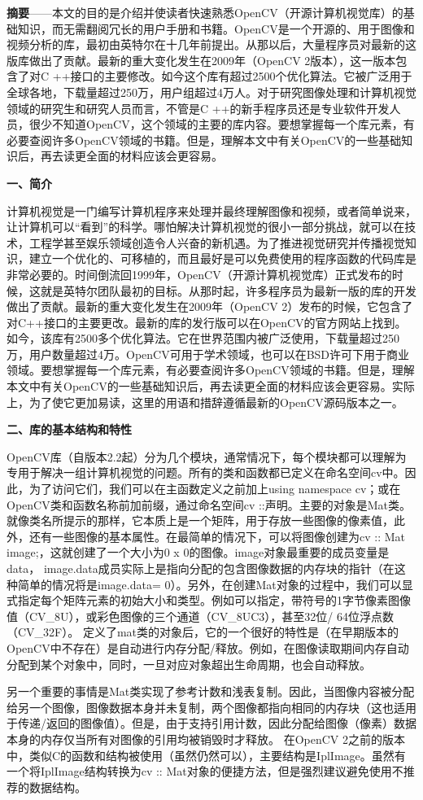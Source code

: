 \documentclass{bjtu-bachelor-thesis}
\begin{document}
\textbf{摘要}——本文的目的是介绍并使读者快速熟悉OpenCV（开源计算机视觉库）的基础知识，而无需翻阅冗长的用户手册和书籍。OpenCV是一个开源的、用于图像和视频分析的库，最初由英特尔在十几年前提出。从那以后，大量程序员对最新的这版库做出了贡献。最新的重大变化发生在2009年（OpenCV 2版本），这一版本包含了对C ++接口的主要修改。如今这个库有超过2500个优化算法。它被广泛用于全球各地，下载量超过250万，用户组超过4万人。对于研究图像处理和计算机视觉领域的研究生和研究人员而言，不管是C ++的新手程序员还是专业软件开发人员，很少不知道OpenCV，这个领域的主要的库内容。要想掌握每一个库元素，有必要查阅许多OpenCV领域的书籍。但是，理解本文中有关OpenCV的一些基础知识后，再去读更全面的材料应该会更容易。\par
\textbf{一、简介} \par
计算机视觉是一门编写计算机程序来处理并最终理解图像和视频，或者简单说来，让计算机可以“看到”的科学。哪怕解决计算机视觉的很小一部分挑战，就可以在技术，工程学甚至娱乐领域创造令人兴奋的新机遇。为了推进视觉研究并传播视觉知识，建立一个优化的、可移植的，而且最好是可以免费使用的程序函数的代码库是非常必要的。时间倒流回1999年，OpenCV（开源计算机视觉库）正式发布的时候，这就是英特尔团队最初的目标。从那时起，许多程序员为最新一版的库的开发做出了贡献。最新的重大变化发生在2009年（OpenCV 2）发布的时候，它包含了对C++接口的主要更改。最新的库的发行版可以在OpenCV的官方网站上找到。如今，该库有2500多个优化算法。它在世界范围内被广泛使用，下载量超过250万，用户数量超过4万。OpenCV可用于学术领域，也可以在BSD许可下用于商业领域。要想掌握每一个库元素，有必要查阅许多OpenCV领域的书籍。但是，理解本文中有关OpenCV的一些基础知识后，再去读更全面的材料应该会更容易。实际上，为了使它更加易读，这里的用语和措辞遵循最新的OpenCV源码版本之一。\par
\textbf{二、库的基本结构和特性} \par
OpenCV库（自版本2.2起）分为几个模块，通常情况下，每个模块都可以理解为专用于解决一组计算机视觉的问题。所有的类和函数都已定义在命名空间cv中。因此，为了访问它们，我们可以在主函数定义之前加上using namespace cv；或在OpenCV类和函数名称前加前缀，通过命名空间cv ::声明。主要的对象是Mat类。就像类名所提示的那样，它本质上是一个矩阵，用于存放一些图像的像素值，此外，还有一些图像的基本属性。在最简单的情况下，可以将图像创建为cv :: Mat image;，这就创建了一个大小为0 x 0的图像。image对象最重要的成员变量是data， image.data成员实际上是指向分配的包含图像数据的内存块的指针（在这种简单的情况将是image.data= 0）。另外，在创建Mat对象的过程中，我们可以显式指定每个矩阵元素的初始大小和类型。例如可以指定，带符号的1字节像素图像值（CV\_8U），或彩色图像的三个通道（CV\_8UC3），甚至32位/ 64位浮点数（CV\_32F）。
定义了mat类的对象后，它的一个很好的特性是（在早期版本的OpenCV中不存在）是自动进行内存分配/释放。例如，在图像读取期间内存自动分配到某个对象中，同时，一旦对应对象超出生命周期，也会自动释放。\par
另一个重要的事情是Mat类实现了参考计数和浅表复制。因此，当图像内容被分配给另一个图像，图像数据本身并未复制，两个图像都指向相同的内存块（这也适用于传递/返回的图像值）。但是，由于支持引用计数，因此分配给图像（像素）数据本身的内存仅当所有对图像的引用均被销毁时才释放。
在OpenCV 2之前的版本中，类似C的函数和结构被使用（虽然仍然可以），主要结构是IplImage。虽然有一个将IplImage结构转换为cv :: Mat对象的便捷方法，但是强烈建议避免使用不推荐的数据结构。\par
\end{document}
